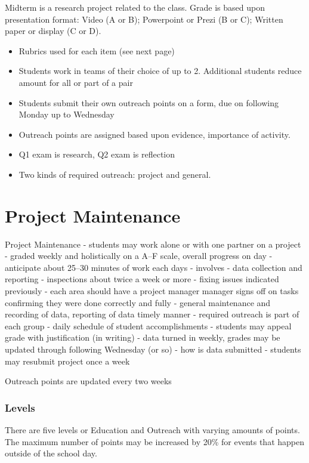 \documentclass[letterpaper,10pt]{memoir}
\begin{document}
	Midterm is a research project related to the class. Grade is based upon presentation format: Video (A or B); Powerpoint or Prezi (B or C); Written paper or display (C or D).



	\begin{itemize}
	\item Rubrics used for each item (see next page)
	\item Students work in teams of their choice of up to 2. Additional students reduce amount for all or part of a pair
	\item Students submit their own outreach points on a form, due on following Monday up to Wednesday
	\item Outreach points are assigned based upon evidence, importance of activity.
	\item Q1 exam is research, Q2 exam is reflection
	\item Two kinds of required outreach: project and general.
	\end{itemize}



	\vspace*{1cm}


	
\newpage
\section*{Project Maintenance}

Project Maintenance
- students may work alone or with one partner on a project
- graded weekly and holistically on a A--F scale, overall progress on day
- anticipate about 25--30 minutes of work each days
- involves
	-	data collection and reporting
	-	inspections about twice a week or more
	-	fixing issues indicated previously
	-	each area should have a project manager
			manager signs off on tasks confirming they were done correctly and fully
	-	general maintenance and recording of data, reporting of data timely manner
	-	required outreach is part of each group
	-	daily schedule of student accomplishments
	-	students may appeal grade with justification (in writing)
	-	data turned in weekly, grades may be updated through following Wednesday (or so)
	-	how is data submitted
	-	students may resubmit project once a week


\newpage
Outreach points are updated every two weeks

\subsubsection*{Levels}
There are five levels or Education and Outreach with varying amounts of points. The maximum number
of points may be increased by 20\% for events that happen outside of the school day.
\end{document}
